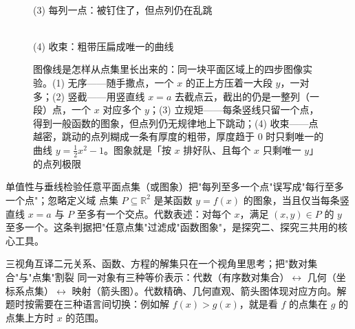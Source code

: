 \begin{explore}
\begin{figure}[htbp]
\begin{minipage}{0.235\textwidth}
    \\[2pt]{\footnotesize (3) 每列一点：被钉住了，但点列仍在乱跳}
  \end{minipage}\hfill
  \begin{minipage}{0.235\textwidth}
    \centering
    \\[2pt]{\footnotesize (4) 收束：粗带压扁成唯一的曲线}
  \end{minipage}
  \caption{图像线是怎样从点集里长出来的：同一块平面区域上的四步图像实验。(1) 无序——随手撒点，一个 $x$ 的正上方压着一大段 $y$，一对多；(2) 竖截——用竖直线 $x=a$ 去截点云，截出的仍是一整列（一段）点，一个 $x$ 对应多个 $y$；(3) 立规矩——每条竖线只留一个点，得到一般函数的图象，但点列仍无规律地上下跳动；(4) 收束——点越密，跳动的点列糊成一条有厚度的粗带，厚度趋于 $0$ 时只剩唯一的曲线 $y=\tfrac12x^2-1$。图象就是「按 $x$ 排好队、且每个 $x$ 只剩唯一 $y$」的点列极限}
  \label{fig:orderline}
\end{figure}

\begin{conccard}[一级]{单值性与垂线检验}{任意平面点集（或图象）}{把"每列至多一个点"误写成"每行至多一个点"；忽略定义域}
点集 $P\subseteq\mathbb{R}^2$ 是某函数 $y=f(x)$ 的图象，当且仅当每条竖直线 $x=a$ 与 $P$ 至多有一个交点。代数表述：对每个 $x$，满足 $(x,y)\in P$ 的 $y$ 至多一个。这条判据把"任意点集"过滤成"函数图象"，是探究二、探究三共用的核心工具。
\end{conccard}

\begin{conccard}[二级]{三视角互译}{二元关系、函数、方程的解集}{只在一个视角里思考；把"数对集合"与"点集"割裂}
同一对象有三种等价表示：代数（有序数对集合）$\leftrightarrow$ 几何（坐标系点集）$\leftrightarrow$ 映射（箭头图）。代数精确、几何直观、箭头图体现对应方向。解题时按需要在三种语言间切换：例如解 $f(x)>g(x)$，就是看 $f$ 的点集在 $g$ 的点集上方时 $x$ 的范围。
\end{conccard}


\end{explore}
